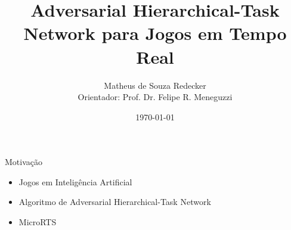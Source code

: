 \documentclass{beamer}
\title[\fontsize{0.08cm}{1em}\selectfont AHTN para Jogos em Tempo Real]{Adversarial Hierarchical-Task Network para Jogos em Tempo Real}
\author[Matheus de Souza Redecker]{Matheus de Souza Redecker
\\{\footnotesize Orientador: Prof. Dr. Felipe R. Meneguzzi}
}
\institute[PUCRS]{Pontificia Universidade Catolia do Rio Grande do Sul
\medskip\\
\url{matheus.redecker@acad.pucrs.br}
}
\date{\today}
\begin{document}

    \begin{frame}
        \titlepage
    \end{frame}



\begin{frame}{Motivação}
	\begin{itemize}
	    \item Jogos em Inteligência Artificial
	    \item Algoritmo de Adversarial Hierarchical-Task Network
	    \item MicroRTS
    \end{itemize}
\end{frame}
\end{document}
